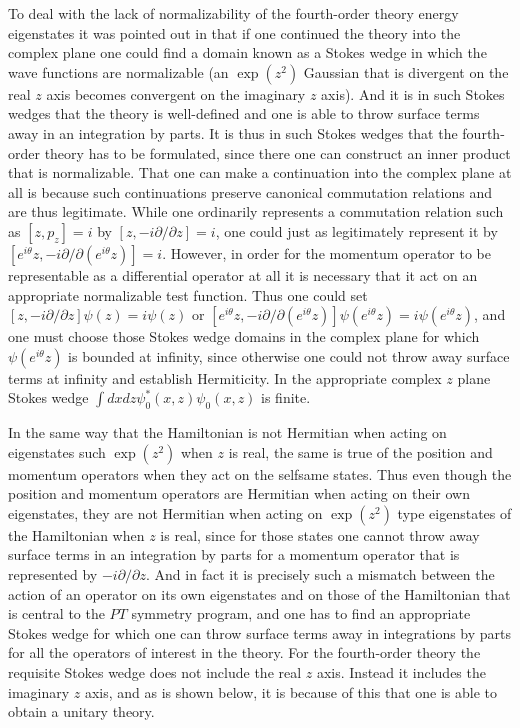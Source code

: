 \documentclass[aps]{revtex4}
\begin{document}
To deal with the lack of normalizability of the fourth-order theory energy eigenstates it was pointed out  in \cite{Bender2008a,Bender2008b} that  if one continued the theory into the complex plane one could find a domain known as a Stokes wedge in which the wave functions are normalizable (an $\exp(z^2)$ Gaussian that is divergent on the real $z$ axis becomes convergent on the imaginary $z$ axis). And it is in such Stokes wedges that the theory is well-defined and one is able to throw surface terms away in an  integration by parts. It is thus in such Stokes wedges that the fourth-order theory has to be formulated, since there one can construct an inner product that is normalizable. That one can make a continuation into the complex plane at all is because such continuations preserve canonical commutation relations  and are thus legitimate. While one ordinarily represents a commutation relation such as $[z,p_z]=i$ by $[z, -i\partial/\partial z]=i$, one could just as legitimately represent it by $[e^{i\theta}z, -i\partial/\partial (e^{i\theta}z)]=i$. However, in order for the momentum operator to be representable as a differential operator at all it is necessary that it act on an appropriate normalizable test function. Thus one could set $[z, -i\partial/\partial z]\psi(z)=i\psi(z)$ or $[e^{i\theta}z, -i\partial/\partial (e^{i\theta}z)]\psi(e^{i\theta}z)=i\psi(e^{i\theta}z)$, and one must choose those Stokes wedge domains in the complex plane for which $\psi(e^{i\theta}z)$ is bounded at infinity, since otherwise one could not throw away surface terms at infinity and establish Hermiticity. In the appropriate complex $z$ plane Stokes wedge $\int dxdz\psi^*_0(x,z)\psi_0(x,z)$ is finite.


In the same way that the Hamiltonian is not Hermitian when acting on eigenstates such $\exp(z^2)$ when $z$ is real, the same is true of the position and momentum operators when they act on the selfsame states. Thus even though the position and momentum operators are Hermitian when acting on their own eigenstates, they are not Hermitian when acting on $\exp(z^2)$ type eigenstates of the Hamiltonian when $z$ is real, since for those states one cannot throw away surface terms in an integration by parts for a momentum operator that is represented by $-i\partial/\partial z$.  And in fact it is precisely such a mismatch between the action of an operator on its own eigenstates and on those of the Hamiltonian that is central to the $PT$ symmetry program, and one has to find an appropriate Stokes wedge for which one can throw surface terms away in integrations by parts for all the operators of interest in the theory. For the fourth-order theory the requisite Stokes wedge does not include the real $z$ axis. Instead it includes the imaginary $z$ axis, and as is shown below, it is because of this that one is able to obtain a unitary theory. 
\end{document}
